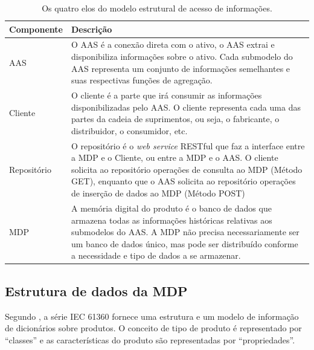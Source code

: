 \documentclass[
	12pt,				%
	oneside,			%
	a4paper,			%
	english,			%
	brazil				%
]{abntex2}
\begin{document}
	\begin{table}[H]
		\centering
		\caption{Os quatro elos do modelo estrutural de acesso de informações.}
		\label{tab:4-elos}

			\begin{tabular}{lp{12cm}}
				\hline
				\rowcolor[HTML]{F0F0F0} 
				{\color[HTML]{000000} \textbf{Componente}} 
				& {\color[HTML]{000000} \textbf{Descrição}} \\ \hline
				\rowcolor[HTML]{FFFFFF} 
				{\color[HTML]{000000} AAS}         
				& {\color[HTML]{000000} O AAS é a conexão direta com o ativo, o AAS extrai e disponibiliza informações sobre o ativo. Cada submodelo do AAS representa um conjunto de informações semelhantes e suas respectivas funções de agregação.} \\
				\rowcolor[HTML]{F7F7F7} 
				{\color[HTML]{000000} Cliente}     
				& {\color[HTML]{000000} O cliente é a parte que irá consumir as informações disponibilizadas pelo AAS. O cliente representa cada uma das partes da cadeia de suprimentos, ou seja, o fabricante, o distribuidor, o consumidor, etc. }  \\
				\rowcolor[HTML]{FFFFFF} 
				{\color[HTML]{000000} Repositório}
				& {\color[HTML]{000000} O repositório é o \textit{web service} RESTful que faz a interface entre a MDP e o Cliente, ou entre a MDP e o AAS. O cliente solicita ao repositório operações de consulta ao MDP (Método GET), enquanto que o AAS solicita ao repositório operações de inserção de dados ao MDP (Método POST)}        \\
				\rowcolor[HTML]{F7F7F7} 
				{\color[HTML]{000000} MDP}
				& {\color[HTML]{000000} A memória digital do produto é o banco de dados que armazena todas as informações históricas relativas aos submodelos do AAS. A MDP não precisa necessariamente ser um banco de dados único, mas pode ser distribuído conforme a necessidade e tipo de dados a se armazenar.}       
			\end{tabular}%

	\end{table}
	
	
	
	
	
	\subsection{Estrutura de dados da MDP}

	Segundo , a série IEC 61360 fornece uma estrutura e um modelo de informação de dicionários sobre produtos. O conceito de tipo de produto é representado por ``classes'' e as características do produto são representadas por ``propriedades''.
\end{document}
